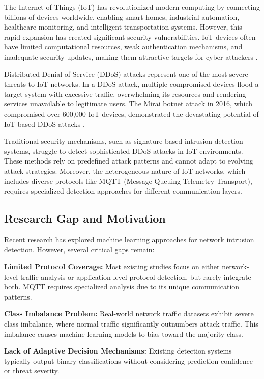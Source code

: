 \documentclass[conference]{IEEEtran}
\begin{document}
The Internet of Things (IoT) has revolutionized modern computing by connecting billions of devices worldwide, enabling smart homes, industrial automation, healthcare monitoring, and intelligent transportation systems. However, this rapid expansion has created significant security vulnerabilities. IoT devices often have limited computational resources, weak authentication mechanisms, and inadequate security updates, making them attractive targets for cyber attackers \cite{iot_security}.

Distributed Denial-of-Service (DDoS) attacks represent one of the most severe threats to IoT networks. In a DDoS attack, multiple compromised devices flood a target system with excessive traffic, overwhelming its resources and rendering services unavailable to legitimate users. The Mirai botnet attack in 2016, which compromised over 600,000 IoT devices, demonstrated the devastating potential of IoT-based DDoS attacks \cite{mirai_attack}.

Traditional security mechanisms, such as signature-based intrusion detection systems, struggle to detect sophisticated DDoS attacks in IoT environments. These methods rely on predefined attack patterns and cannot adapt to evolving attack strategies. Moreover, the heterogeneous nature of IoT networks, which includes diverse protocols like MQTT (Message Queuing Telemetry Transport), requires specialized detection approaches for different communication layers.

\subsection{Research Gap and Motivation}

Recent research has explored machine learning approaches for network intrusion detection. However, several critical gaps remain:

\textbf{Limited Protocol Coverage:} Most existing studies focus on either network-level traffic analysis or application-level protocol detection, but rarely integrate both. MQTT requires specialized analysis due to its unique communication patterns.

\textbf{Class Imbalance Problem:} Real-world network traffic datasets exhibit severe class imbalance, where normal traffic significantly outnumbers attack traffic. This imbalance causes machine learning models to bias toward the majority class.

\textbf{Lack of Adaptive Decision Mechanisms:} Existing detection systems typically output binary classifications without considering prediction confidence or threat severity.
\end{document}

